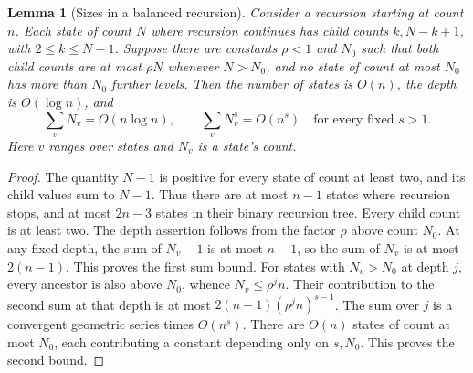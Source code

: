 \documentclass[11pt]{article}
\newtheorem{lemma}[theorem]{Lemma}
\theoremstyle{definition}
\begin{document}
\begin{lemma}[Sizes in a balanced recursion]\label{lem:recursion-size}
Consider a recursion starting at count $n$. Each state of count $N$
where recursion continues has child counts $k,N-k+1$, with
$2\le k\le N-1$.
Suppose there are constants $\rho<1$ and $N_0$ such that both child
counts are at most $\rho N$ whenever $N>N_0$, and no state of count
at most $N_0$ has more than $N_0$ further levels. Then the number of
states is $O(n)$, the depth is $O(\log n)$, and
\[
 \sum_v N_v=O(n\log n),\qquad
 \sum_v N_v^s=O(n^s)\quad\text{for every fixed }s>1.
\]
Here $v$ ranges over states and $N_v$ is a state's count.
\end{lemma}
\begin{proof}
The quantity $N-1$ is positive for every state of count at least two,
and its child values sum to $N-1$. Thus there are at most $n-1$
states where recursion stops, and at most $2n-3$ states in
their binary recursion tree. Every child count is at least two.
The depth assertion follows
from the factor $\rho$ above count $N_0$.
At any fixed depth, the sum of $N_v-1$ is at most $n-1$, so the sum
of $N_v$ is at most $2(n-1)$. This proves the first sum bound.
For states with $N_v>N_0$ at depth $j$, every ancestor is also above
$N_0$, whence $N_v\le\rho^j n$. Their contribution to the second sum
at that depth is at most $2(n-1)(\rho^j n)^{s-1}$.
The sum over $j$ is a convergent geometric series times $O(n^s)$.
There are $O(n)$ states of count at most $N_0$, each contributing a
constant depending only on $s,N_0$. This proves the second bound.
\end{proof}
\end{document}
